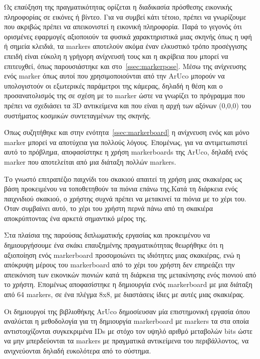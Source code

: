 Ως επαύξηση της πραγματικότητας ορίζεται η διαδικασία πρόσθεσης εικονικής πληροφορίας σε εικόνες ή βίντεο. Για να συμβεί κάτι τέτοιο, πρέπει να γνωρίζουμε που ακριβώς πρέπει να απεικονιστεί η εικονική πληροφορία. Παρά το γεγονός ότι ορισμένες εφαρμογές αξιοποιούν τα φυσικά χαρακτηριστικά μιας σκηνής όπως η υφή ή σημεία κλειδιά, τα markers αποτελούν ακόμα έναν ελκυστικό τρόπο προσέγγισης επειδή είναι εύκολη η γρήγορη ανίχνευσή τους και η ακρίβεια που μπορεί να επιτευχθεί, όπως παρουσιάστηκε και στο~\ref{ssec:markerpose}. Μέσω της ανίχνευσης ενός marker όπως αυτοί που χρησιμοποιούνται από την ArUco μπορούν να υπολογιστούν οι εξωτερικές παράμετροι της κάμερας, δηλαδή η θέση και ο προσανατολισμός της σε σχέση με το marker ώστε να γνωρίζει το πρόγραμμα που πρέπει να σχεδιάσει τα 3D αντικείμενα και που είναι η αρχή των αξόνων (0,0,0) του συστήματος κοσμικών συντεταγμένων της σκηνής. 

Όπως συζητήθηκε και στην ενότητα~\ref{ssec:markerboard} η ανίχνευση ενός και μόνο marker μπορεί να αποτύχεια για πολλούς λόγους. Επομένως, για να αντιμετωπιστεί αυτό το πρόβλημα, αποφασίστηκε η χρήση markerboards της ArUco, δηλαδή ενός marker που αποτελείται από μια διάταξη πολλών markers.

Το γνωστό επιτραπέζιο παιχνίδι του σκακιού απαιτεί τη χρήση μιας σκακιέρας ως βάση προκειμένου να τοποθετηθούν τα πιόνια επάνω της.Kατά τη διάρκεια ενός παιχνιδιού σκακιού, ο χρήστης συχνά πρέπει να μετακινεί τα πιόνια με το χέρι του. Όταν συμβαίνει αυτό, το χέρι του χρήστη περνά πάνω από τη σκακιέρα αποκρύπτοντας ένα αρκετά σημαντικό μέρος της. 

Στα πλαίσια της παρούσας διπλωματικής εργασίας και προκειμένου να δημιουργήσουμε ένα σκάκι επαυξημένης πραγματικότητας θεωρήθηκε ότι η αξιοποίηση ενός markerboard προσομοιώνει τις ιδιότητες μιας σκακιέρας, ενώ η απόκρυψη μέρους του markerboard από το χέρι του χρήστη δεν επηρεάζει την απεικόνιση των εικονικών πιονιών κατά τη διάρκεια της μετακίνησης ενός πιονιού από το χρήστη. Επομένως αποφασίστηκε η δημιουργία ενός markerboard με μια διάταξη από 64 markers, σε ένα πλέγμα 8x8, με διαστάσεις ίδιες με αυτές μιας σκακιέρας.


Οι δημιουργοί της βιβλιοθήκης ArUco δημοσίευσαν μία επιστημονική εργασία \cite{garrido2014automatic} όπου αναλύεται η μεθοδολογία για τη δημιουργία markerboard με markers τα στα οποία αντιστοιχίζονται συγκεκριμένα IDs με στόχο τον υψηλό αριθμό μεταβολών bits ώστε να μην μπερδεύονται τα markers με πραγματικά αντικείμενα του περιβάλλοντος, να ανιχνεύονται δηλαδή ευκολότερα από το σύστημα. 

